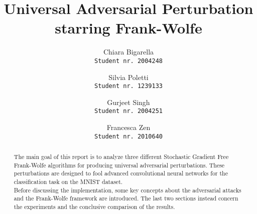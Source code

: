 \documentclass[10pt,twocolumn,letterpaper]{article}
\begin{document}
\title{Universal Adversarial Perturbation \\ starring Frank-Wolfe}
\author{Chiara Bigarella\\{\tt\footnotesize Student nr. 2004248}\and Silvia Poletti\\{\tt\footnotesize Student nr. 1239133}\and Gurjeet Singh\\{\tt\footnotesize Student nr. 2004251}\and Francesca Zen\\{\tt\footnotesize Student nr. 2010640}}
\maketitle

\begin{abstract}
	The main goal of this report is to analyze three different Stochastic Gradient Free Frank-Wolfe algorithms for producing universal adversarial perturbations. These perturbations are designed to fool advanced convolutional neural networks for the classification task on the MNIST dataset.\\
	\indent Before discussing the implementation, some key concepts about the adversarial attacks and the Frank-Wolfe framework are introduced. The last two sections instead concern the experiments and the conclusive comparison of the results.
\end{abstract}













{\small
	
	
}
\end{document}

